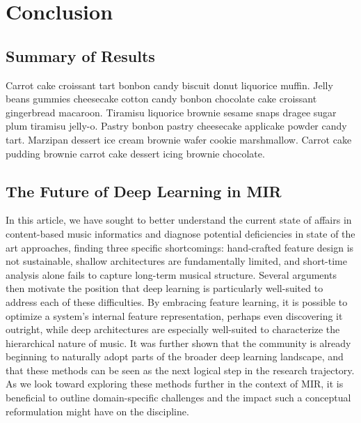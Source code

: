 \graphicspath{{8/figures/}}
\chapter{Conclusion}
\label{chp:conclusion}



\section{Summary of Results}
Carrot cake croissant tart bonbon candy biscuit donut liquorice muffin.
Jelly beans gummies cheesecake cotton candy bonbon chocolate cake croissant gingerbread macaroon.
Tiramisu liquorice brownie sesame snaps dragee sugar plum tiramisu jelly-o.
Pastry bonbon pastry cheesecake applicake powder candy tart.
Marzipan dessert ice cream brownie wafer cookie marshmallow.
Carrot cake pudding brownie carrot cake dessert icing brownie chocolate.


\section{The Future of Deep Learning in MIR}\label{sec:conclusions}
\label{sec:future}

In this article, we have sought to better understand the current state of affairs in content-based music informatics and diagnose potential deficiencies in state of the art approaches, finding three specific shortcomings: hand-crafted feature design is not sustainable, shallow architectures are fundamentally limited, and short-time analysis alone fails to capture long-term musical structure.
Several arguments then motivate the position that deep learning is particularly well-suited to address each of these difficulties.
By embracing feature learning, it is possible to optimize a system's internal feature representation, perhaps even discovering it outright, while deep architectures are especially well-suited to characterize the hierarchical nature of music.
It was further shown that the community is already beginning to naturally adopt parts of the broader deep learning landscape, and that these methods can be seen as the next logical step in the research trajectory.
As we look toward exploring these methods further in the context of MIR, it is beneficial to outline domain-specific challenges and the impact such a conceptual reformulation might have on the discipline.


